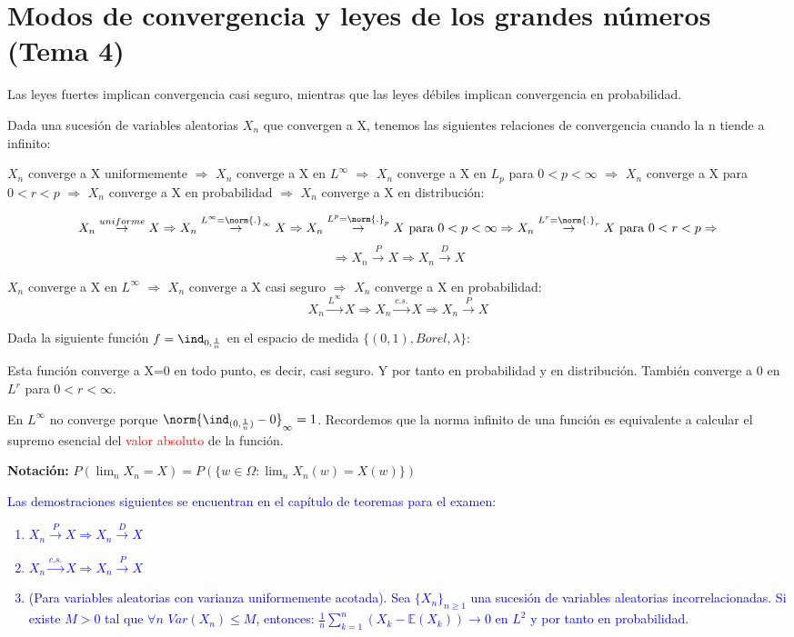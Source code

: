 \documentclass{apuntes}
\begin{document}
\chapter{Modos de convergencia y leyes de los grandes números (Tema 4)}
Las leyes fuertes implican convergencia casi seguro, mientras que las leyes débiles implican convergencia en probabilidad.

Dada una sucesión de variables aleatorias $X_n$ que convergen a X, tenemos las siguientes relaciones de convergencia cuando la n tiende a infinito:

$X_n$ converge a X uniformemente  $\Rightarrow$ $X_n$ converge a X en $L^{\infty}$  $\Rightarrow$ $X_n$ converge a X en $L_p$ para $0<p<\infty$  $\Rightarrow$ $X_n$ converge a X para $0<r<p$  $\Rightarrow$ $X_n$ converge a X en probabilidad  $\Rightarrow$ $X_n$ converge a X en distribución:

\[
X_n \stackrel{uniforme}{\rightarrow} X \Rightarrow X_n \stackrel{L^{\infty}=\norm{.}_{\infty}}{\rightarrow} X \Rightarrow X_n \stackrel{L^p=\norm{.}_p}{\rightarrow} X \text{ para } 0<p<\infty \Rightarrow  X_n \stackrel{L^r=\norm{.}_r}{\rightarrow} X \text{ para } 0<r<p \Rightarrow 
\]
\[
\Rightarrow X_n \stackrel{P}{\rightarrow} X \Rightarrow X_n \stackrel{D}{\rightarrow} X  
\] 

$X_n$ converge a X en $L^{\infty}$ $\Rightarrow$ $X_n$ converge a X casi seguro $\Rightarrow$ $X_n$ converge a X en probabilidad:
\[
X_n \stackrel{L^{\infty}}{\rightarrow} X \Rightarrow X_n \stackrel{c.s.}{\rightarrow} X \Rightarrow X_n \stackrel{P}{\rightarrow} X
\]

\begin{example}
Dada la siguiente función $f=\ind_{0,\frac{1}{n}}$ en el espacio de medida $\{(0,1), Borel, \lambda\}$:

Esta función converge a X=0 en todo punto, es decir, casi seguro. Y por tanto en probabilidad y en distribución. También converge a 0 en $L^r$ para $0<r<\infty$.

En $L^{\infty}$ no converge porque $\norm{\ind_{(0, \frac{1}{n})}-0}_{\infty} = 1$. Recordemos que la norma infinito de una función es equivalente a calcular el supremo esencial del \textcolor{red}{valor absoluto} de la función.
\end{example}

\textbf{Notación:} $P(\lim_n X_n=X) = P(\{w \in \Omega: \lim_n X_n(w)=X(w)\})$

\textcolor{blue}{Las demostraciones siguientes se encuentran en el capítulo de teoremas para el examen:
\begin{enumerate}
\item $X_n \stackrel{P}{\rightarrow} X  \Rightarrow X_n \stackrel{D}{\rightarrow} X$
\item $X_n \stackrel{c.s.}{\rightarrow} X  \Rightarrow X_n \stackrel{P}{\rightarrow} X$
\item (Para variables aleatorias con varianza uniformemente acotada). Sea $\{X_n\}_{n\geq 1}$ una sucesión de variables aleatorias incorrelacionadas. Si existe $M>0$ tal que $\forall n$ $Var(X_n)\leq M$, entonces: $\frac{1}{n}\sum_{k=1}^{n}(X_k -\mathbb{E}(X_k)) \rightarrow 0$ en $L^2$ y por tanto en probabilidad.
\end{enumerate}}
\end{document}

